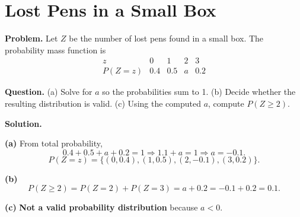 		\section{Lost Pens in a Small Box}
		
		\textbf{Problem.}
		Let $Z$ be the number of lost pens found in a small box. The probability mass function is
		\[
		\begin{array}{c|cccc}
			z & 0 & 1 & 2 & 3\\
			\hline
			P(Z=z) & 0.4 & 0.5 & a & 0.2
		\end{array}
		\]
		
		\textbf{Question.}
		(a) Solve for $a$ so the probabilities sum to 1.
		(b) Decide whether the resulting distribution is valid.
		(c) Using the computed $a$, compute $P(Z\ge 2)$.
		
		\textbf{Solution.}

		\textbf{(a)} From total probability,
		\[
		0.4+0.5+a+0.2=1\Rightarrow 1.1+a=1\Rightarrow a=-0.1.
		\]
		\[
		P(Z=z)=\{(0,0.4),(1,0.5),(2,-0.1),(3,0.2)\}.
		\]
		\begin{center}
		\end{center}
		

		\textbf{(b)}
		\[
		P(Z\ge 2)=P(Z=2)+P(Z=3)=a+0.2=-0.1+0.2=0.1.
		\]
		\begin{center}
		\end{center}
		\textbf{(c)} \textbf{Not a valid probability distribution} because $a<0$.

		
